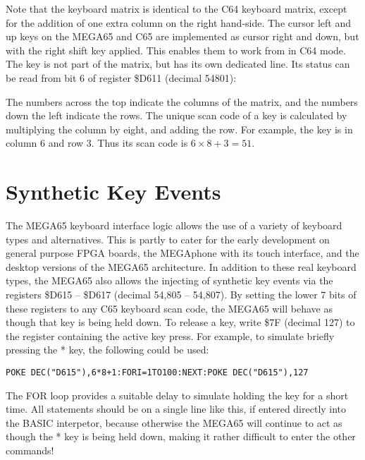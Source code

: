 Note that the keyboard matrix is identical to the C64 keyboard matrix, except for the addition of one extra column
on the right hand-side.  The cursor left and up keys on the MEGA65 and C65 are implemented as cursor right and down, but
with the right shift key applied.  This enables them to work from in C64 mode.  The  key is not
part of the matrix, but has its own dedicated line.  Its status can be read from bit 6 of register \$D611 (decimal 54801):

The numbers across the top indicate the columns of the matrix, and the numbers down the left indicate the rows.
The unique scan code of a key is calculated by multiplying the column by eight, and adding the row.  For example,
the  key is in column 6 and row 3. Thus its scan code is $6 \times 8 + 3 = 51$.

\section{Synthetic Key Events}

The MEGA65 keyboard interface logic allows the use of a variety of keyboard types and alternatives. This is partly
to cater for the early development on general purpose FPGA boards, the MEGAphone with its touch interface, and the
desktop versions of the MEGA65 architecture.  In addition to these real keyboard types, the MEGA65 also allows the
injecting of synthetic key events via the registers \$D615 -- \$D617 (decimal 54,805 -- 54,807).  By setting the
lower 7 bits of these registers to any C65 keyboard scan code, the MEGA65 will behave as though that key is being
held down.  To release a key, write \$7F (decimal 127) to the register containing the active key press. For example,
to simulate briefly pressing the * key, the following could be used:

\begin{tcolorbox}[colback=black,coltext=white]
\verbatimfont{\codefont}
\begin{verbatim}
POKE DEC("D615"),6*8+1:FORI=1TO100:NEXT:POKE DEC("D615"),127
\end{verbatim}
\end{tcolorbox}

The FOR loop provides a suitable delay to simulate holding the key for a short time.  All statements should be on a single line
like this, if entered directly into the BASIC interpetor, because otherwise the MEGA65 will continue to act as though the * key
is being held down, making it rather difficult to enter the other commands!

